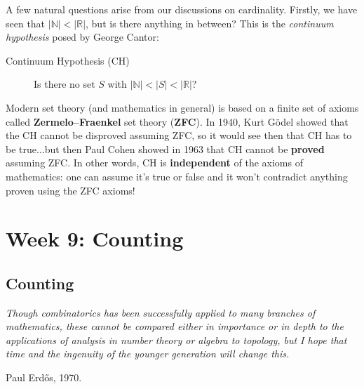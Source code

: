 \documentclass[11pt,dvipsnames]{book}
\def\R{\mathbb{R}}
\def\N{{\mathbb{N}}}
\numberwithin{figure}{section} %
\numberwithin{table}{section} %
\begin{document}
A few natural questions arise from our discussions on cardinality. Firstly, we have seen that $|\N|<|\R|$, but is there anything in between? This is the {\it continuum hypothesis} posed by George Cantor:\\

\begin{description}
\item[Continuum Hypothesis (CH)] Is there no set $S$ with $|\mathbb{N}|<|S|<|\mathbb{R}|$?\\
\end{description}

Modern set theory (and mathematics in general) is based on a finite set of axioms called {\bf Zermelo--Fraenkel} set theory ({\bf ZFC}). In 1940, Kurt G\"odel showed that the CH cannot be disproved assuming ZFC, so it would see then that CH has to be true...but then Paul Cohen showed in 1963 that CH cannot be {\bf proved} assuming ZFC. In other words, CH is {\bf independent} of the axioms of mathematics: one can assume it's true or false and it won't contradict anything proven using the ZFC axioms!

%


\part{Week 9: Counting}


\chapter{Counting}

\epigraph{\it    Though combinatorics has been successfully applied to many branches of mathematics, these cannot be compared either in importance or in depth to the applications of analysis in number theory or algebra to topology, but I hope that time and the ingenuity of the younger generation will change this.
}{Paul Erd\H{o}s, 1970.}
\end{document}
